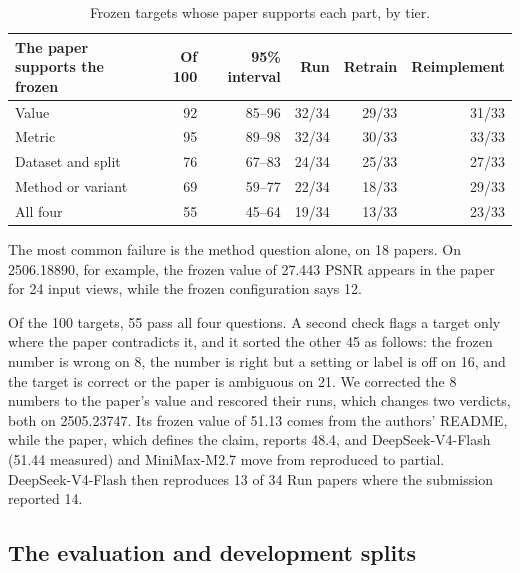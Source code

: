 \begin{table}[ht]
\centering
\small
\begin{tabular}{@{}lrrrrr@{}}
\toprule
The paper supports the frozen & Of 100 & 95\% interval & Run & Retrain & Reimplement \\
\midrule
Value          & 92 & 85--96 & 32/34 & 29/33 & 31/33 \\
Metric         & 95 & 89--98 & 32/34 & 30/33 & 33/33 \\
Dataset and split & 76 & 67--83 & 24/34 & 25/33 & 27/33 \\
Method or variant & 69 & 59--77 & 22/34 & 18/33 & 29/33 \\
\midrule
All four       & 55 & 45--64 & 19/34 & 13/33 & 23/33 \\
\bottomrule
\end{tabular}
\caption{Frozen targets whose paper supports each part, by tier.}
\label{tab:target-check}
\end{table}

The most common failure is the method question alone, on 18 papers. On
2506.18890, for example, the frozen value of 27.443 PSNR appears in the paper
for 24 input views, while the frozen configuration says 12.

Of the 100 targets, 55 pass all four questions. A second check flags a target
only where the paper contradicts it, and it sorted the other 45 as follows: the
frozen number is wrong on 8, the number is right but a setting or label is off
on 16, and the target is correct or the paper is ambiguous on 21. We corrected
the 8 numbers to the paper's value and rescored their runs, which changes two
verdicts, both on 2505.23747. Its frozen value of 51.13 comes from the
authors' README, while the paper, which defines the claim, reports 48.4, and
DeepSeek-V4-Flash (51.44 measured) and MiniMax-M2.7 move from reproduced to
partial. DeepSeek-V4-Flash then reproduces 13 of 34 Run papers where the
submission reported 14.

\subsection{The evaluation and development splits}
\label{app:splits}

